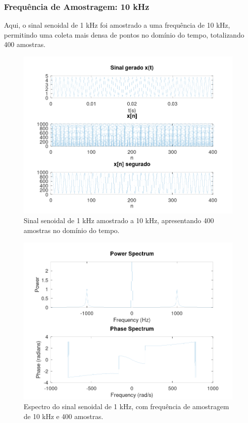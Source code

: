 \subsubsection{Frequência de Amostragem: 10 kHz}

Aqui, o sinal senoidal de 1 kHz foi amostrado a uma frequência de 10 kHz, permitindo uma coleta mais densa de pontos no domínio do tempo, totalizando 400 amostras.

\begin{figure}[H]
    \centering
    \includegraphics[width=1\linewidth]{03_results/assets/sin__1KHz_fs10k_SIGNAL_400smp.png}
    \caption{Sinal senoidal de 1 kHz amostrado a 10 kHz, apresentando 400 amostras no domínio do tempo.}
    \label{fig:signal-10kHz-1kHz-400smp}
\end{figure}

\begin{figure}[H]
    \centering
    \includegraphics[width=1\linewidth]{03_results/assets/sin__1KHz_fs10k_SPECTRUM_400smp.png}
    \caption{Espectro do sinal senoidal de 1 kHz, com frequência de amostragem de 10 kHz e 400 amostras.}
    \label{fig:spectrum-10kHz-1kHz-400smp}
\end{figure}

